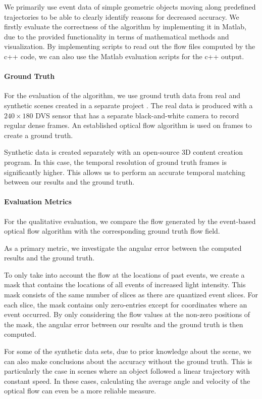 We primarily use event data of simple geometric objects moving along predefined trajectories to be able to clearly identify reasons for decreased accuracy.
We firstly evaluate the correctness of the algorithm by implementing it in Matlab, due to the provided functionality in terms of mathematical methods and visualization.
By implementing scripts to read out the flow files computed by the c++ code, we can also use the Matlab evaluation scripts for the c++ output.
\paragraph{Ground Truth}
For the evaluation of the algorithm, we use ground truth data from real and synthetic scenes created in a separate project \cite{Scherer2015}.
The real data is produced with a $240\times180$ DVS sensor that has a separate black-and-white camera to record regular dense frames.
An established optical flow algorithm is used on frames to create a ground truth.


Synthetic data is created separately with an open-source 3D content creation program. 
In this case, the temporal resolution of ground truth frames is significantly higher. %
This allows us to perform an accurate temporal matching between our results and the ground truth.

\paragraph{Evaluation Metrics}
For the qualitative evaluation, we compare the flow generated by the event-based optical flow algorithm with the corresponding ground truth flow field.

As a primary metric, we investigate the angular error between the computed results and the ground truth. 

To only take into account the flow at the locations of past events, we create a mask that contains the locations of all events of increased light intensity.
This mask consists of the same number of slices as there are quantized event slices.
For each slice, the mask contains only zero-entries except for coordinates where an event occurred. 
By only considering the flow values at the non-zero positions of the mask, 
the angular error between our results and the ground truth is then computed.


For some of the synthetic data sets, due to prior knowledge about the scene, we can also make conclusions about the accuracy without the ground truth.
This is particularly the case in scenes where an object followed a linear trajectory with constant speed.
In these cases, calculating the average angle and velocity of the optical flow can even be a more reliable measure. 

